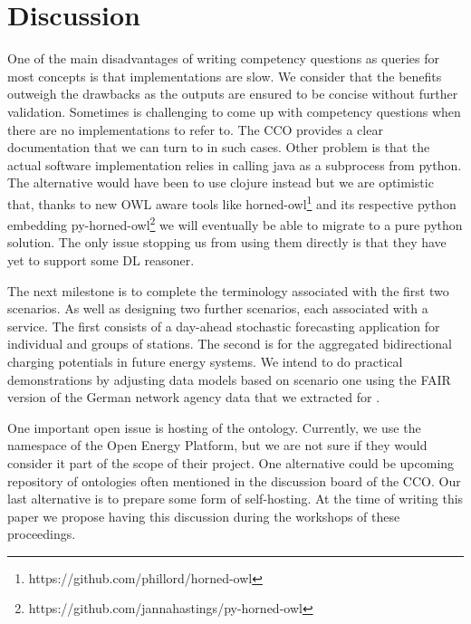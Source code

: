 \section{Discussion}
\label{discussion}

One of the main disadvantages of writing competency questions as queries for
most concepts is that implementations are slow. We consider that the benefits
outweigh the drawbacks as the outputs are ensured to be concise without further
validation. Sometimes is challenging to come up with competency questions when
there are no implementations to refer to. The CCO provides a clear documentation
that we can turn to in such cases. Other problem is that the actual software
implementation relies in calling java as a subprocess from python. The
alternative would have been to use clojure instead but we are optimistic that,
thanks to new OWL aware tools like
horned-owl\footnote{https://github.com/phillord/horned-owl} and its respective
python embedding
py-horned-owl\footnote{https://github.com/jannahastings/py-horned-owl} we will
eventually be able to migrate to a pure python solution. The only issue stopping
us from using them directly is that they have yet to support some DL reasoner.

The next milestone is to complete the terminology associated with the first two
scenarios. As well as designing two further scenarios, each associated with a
service. The first consists of a day-ahead stochastic forecasting application
for individual and groups of stations. The second is for the aggregated
bidirectional charging potentials in future energy systems.  
We intend to do practical demonstrations  by adjusting data models based on
scenario one using the FAIR version of the German network agency data that we
extracted for \cite{ArellanoRuiz.2024}.

One important open issue is hosting of the ontology. Currently, we use the
namespace of the Open Energy Platform, but we are not sure if they would
consider it part of the scope of their project. One alternative could be
upcoming repository of ontologies often mentioned in the discussion board of the
CCO. Our last alternative is to prepare some form of self-hosting. At the time
of writing this paper we propose having this discussion during the workshops of
these proceedings.
